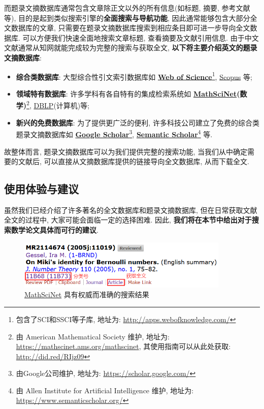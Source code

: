 \documentclass{booki}
\begin{document}
而题录文摘数据库通常包含文章除正文以外的所有信息(如标题, 摘要, 参考文献等), 目的是起到类似搜索引擎的\textbf{全面搜索与导航功能}, 因此通常能够包含大部分全文数据库的文章, 只需要在题录文摘数据库搜索到相应条目即可进一步导向全文数据库. 可以方便我们快速全面地搜索文章标题, 查看摘要及文献引用信息. 由于中文文献通常从知网就能完成较为完整的搜索与获取全文, \textbf{以下将主要介绍英文的题录文摘数据库}:
\begin{itemize}
    \item \textbf{综合类数据库}: 大型综合性引文索引数据库如 \textbf{\href{http://apps.webofknowledge.com/}{Web of Science}}\footnote{包含了SCI和SSCI等子库, 地址为: \url{http://apps.webofknowledge.com/}}, \href{https://www.scopus.com/}{Scopus} 等;
    \item \textbf{领域特有数据库}: 许多学科有各自特有的集成检索系统如 \textbf{\href{https://mathscinet.ams.org/mathscinet}{MathSciNet}(数学)}\footnote{由 American Mathematical Society 维护, 地址为: \url{https://mathscinet.ams.org/mathscinet}, 其使用指南可以从此处获取: \url{http://did.red/RIjz09}}, \href{https://dblp.uni-trier.de/}{DBLP}(计算机)等;
    \item \textbf{新兴的免费数据库}: 为了提供更广泛的便利, 许多科技公司建立了免费的综合类题录文摘数据库如 \textbf{\href{https://scholar.google.com/}{Google Scholar}}\footnote{由Google公司维护, 地址为: \url{https://scholar.google.com/}}, \textbf{\href{https://www.semanticscholar.org/}{Semantic Scholar}}\footnote{由 Allen Institute for Artificial Intelligence 维护, 地址为: \url{https://www.semanticscholar.org/}} 等.
\end{itemize}

故整体而言, 题录文摘数据库可以为我们提供完整的搜索功能, 当我们从中确定需要的文献后, 可以直接从文摘数据库提供的链接导向全文数据库, 从而下载全文.

\subsection{使用体验与建议}
虽然我们已经介绍了许多著名的全文数据库和题录文摘数据库, 但在日常获取文献全文的过程中, 大家可能会面临一定的选择困难. 因此, {\textbf{我们将在本节中给出对于搜索数学论文具体而可行的建议}}.
\begin{figure}[htbp]
    \centering
    \includegraphics[width=0.9\textwidth]{figure/mathscinet.png}
    \caption{\href{https://mathscinet.ams.org/mathscinet}{MathSciNet} 具有权威而准确的搜索结果}
    \label{fig:mathscinet}
\end{figure}
\end{document}
